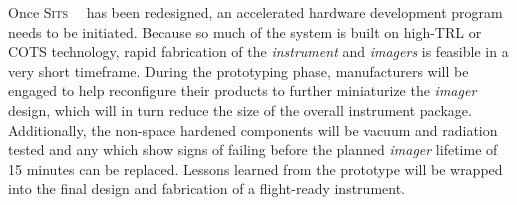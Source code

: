 \documentclass{tufte-handout}
\newcommand{\sitsshort}[0]{\textsc{Sits}}%
\begin{document}

Once \sitsshort~~ has been redesigned, an accelerated hardware development program
needs to be initiated. Because so much of the system is built on high-TRL or COTS 
technology, rapid fabrication of the \textit{instrument} and \textit{imagers} is feasible in 
a very short timeframe. During the prototyping phase, manufacturers will be 
engaged to help reconfigure their products to further miniaturize the \textit{imager} 
design, which will in turn reduce the size of the overall instrument package.
Additionally, the non-space hardened components will be vacuum and radiation tested 
and any which show signs of failing before the planned \textit{imager} lifetime of 15 minutes
can be replaced. Lessons learned from the prototype will be wrapped into the final design
and fabrication of a flight-ready instrument.

\end{document}
